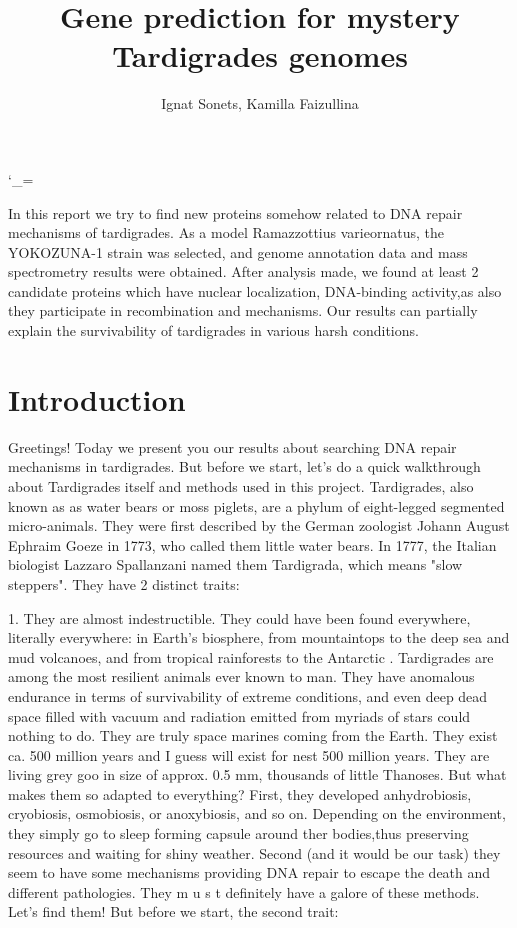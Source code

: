 \documentclass{article}
\title{ Gene prediction for mystery Tardigrades genomes }
\author{ Ignat Sonets, Kamilla Faizullina}
\date{\empty}
\begin{document}
	\catcode`\_=\active
\maketitle
 
 
 In this report we try to find new proteins somehow related to DNA repair mechanisms of tardigrades. As a model Ramazzottius varieornatus, the YOKOZUNA-1 strain was selected, and genome annotation data and mass spectrometry results were obtained. After analysis made, we found at least 2 candidate proteins which have  nuclear localization, DNA-binding activity,as also they participate in recombination and mechanisms. Our results can partially explain the survivability of tardigrades in various harsh conditions.
 
 
\section{Introduction}
 
 Greetings! Today we present you our results about searching DNA repair mechanisms in tardigrades. But before we start, let's do a quick walkthrough about Tardigrades itself and methods used in this project.
 Tardigrades, also known as as water bears or moss piglets, are a phylum of eight-legged segmented micro-animals. They were first described by the German zoologist Johann August Ephraim Goeze in 1773, who called them little water bears. In 1777, the Italian biologist Lazzaro Spallanzani named them Tardigrada, which means "slow steppers"\cite{1}. 
 They have 2 distinct traits:
 
 1. They are almost indestructible. They could have been found everywhere, literally everywhere: in Earth's biosphere, from mountaintops to the deep sea and mud volcanoes, and from tropical rainforests to the Antarctic \cite{1}. Tardigrades are among the most resilient animals ever known to man. They have anomalous endurance in terms of survivability of extreme conditions, and even deep dead space filled with vacuum and radiation emitted from myriads of stars could nothing to do. They are truly space marines coming from the Earth. They exist ca. 500 million years and I guess will exist for nest 500 million years. They are living grey goo in size of approx. 0.5 mm, thousands of little Thanoses. But what makes them so adapted to everything? First, they developed  anhydrobiosis, cryobiosis, osmobiosis, or anoxybiosis, and so on. Depending on the environment, they simply go to sleep forming capsule around ther bodies,thus preserving resources and waiting for shiny weather. Second (and it would be our task) they seem to have some mechanisms providing DNA repair to escape the death and different pathologies. They m u s t definitely have a galore of these methods. Let's find them! But before we start, the second trait:
 
\end{document}

